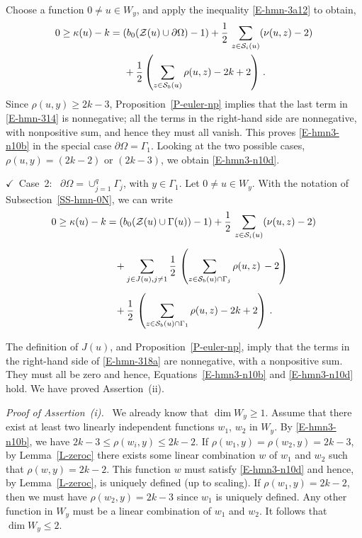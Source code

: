 \documentclass[12pt,a4paper]{amsart}
\theoremstyle{plain} %
\theoremstyle{definition}
\numberwithin{equation}{section}
\numberwithin{figure}{section}
\numberwithin{table}{section}
\newcommand{\cS}{\mathcal{S}}
\newcommand{\cZ}{\mathcal{Z}}
\newcommand{\noi}{\noindent}
\newcommand{\noih}{\noindent $\checkmark$~}
\begin{document}
Choose a function $0 \neq u \in W_y$, and apply the inequality \eqref{E-hmn-3a12} to obtain,
%
\begin{equation}\label{E-hmn-314}
\begin{split}
0 \geq  \kappa(u) - k & = \left( b_0(\cZ(u) \cup \partial \Omega) -1 \right) + \frac 12\, \sum_{z \in \cS_i(u)} (\nu(u,z)-2) \\
&\hspace{5mm} + \frac 12 \left( \sum_{z\in \cS_b(u)}\rho (u,z) - 2k +2\right) \,.
\end{split}
\end{equation}
%
Since $\rho(u,y) \ge 2k -3$, Proposition~\ref{P-euler-np} implies that the last term in \eqref{E-hmn-314} is nonnegative; all the terms in the right-hand side are nonnegative, with nonpositive sum, and hence they must all vanish. This proves \eqref{E-hmn3-n10b} in the special case $\partial \Omega = \Gamma_1$. Looking at the two possible cases, $\rho(u,y) = (2k - 2)$ or $(2k -3)$, we obtain \eqref{E-hmn3-n10d}. \smallskip

\noih Case~2:~ $\partial \Omega = \cup_{j=1}^q \Gamma_j$, with $y \in \Gamma_1$. Let $0 \neq u \in W_y$. With the notation of   Subsection~\ref{SS-hmn-0N}, we can write
%
\begin{equation}\label{E-hmn-318a}
\begin{split}
0 \ge \kappa(u) - k &= \left( b_0(\cZ(u) \cup \Gamma(u)) - 1\right) + \frac 12\, \sum_{z \in \cS_i(u)} (\nu(u,z)-2)  \\[5pt]
&\hspace{3mm}+ \sum_{j \in J(u), j\not = 1} \frac 12\, \left( \sum_{z\in \cS_b(u) \cap \Gamma_j}\rho(u,z) \, - 2\right)\\[5pt]
&\hspace{3mm} + \frac 12\, \left( \sum_{z\in \cS_b(u) \cap \Gamma_1}\rho(u,z) - 2k +2\right)\,.
\end{split}
\end{equation}

The definition of $J(u)$, and Proposition~\ref{P-euler-np}, imply that the terms in the right-hand side of \eqref{E-hmn-318a} are nonnegative, with a nonpositive sum. They must all be zero and hence,  Equations~\eqref{E-hmn3-n10b} and \eqref{E-hmn3-n10d} hold. We have proved Assertion~(ii).\medskip

\noi \emph{Proof of Assertion~(i).~} We already know that $\dim W_y  \ge 1$. Assume that there exist at least two linearly independent functions $w_1$, $w_2$ in $W_y$. By \eqref{E-hmn3-n10b}, we have $2k- 3 \le \rho(w_i,y) \le 2k - 2$.  If $\rho(w_1,y) = \rho(w_2,y) = 2k - 3$, by Lemma~\ref{L-zeroc} there exists some linear combination $w$ of $w_1$ and $w_2$ such that $\rho(w,y) = 2k -2$. This function $w$ must satisfy \eqref{E-hmn3-n10d} and hence, by Lemma~\ref{L-zeroc}, is uniquely defined (up to scaling). If $\rho(w_1,y) = 2k - 2$, then we must have $\rho(w_2,y) = 2k -3$ since $w_1$ is uniquely defined. Any other function in $W_y$ must be a linear combination of $w_1$ and $w_2$. It follows that $\dim W_y \le 2$.\smallskip
\end{document}
